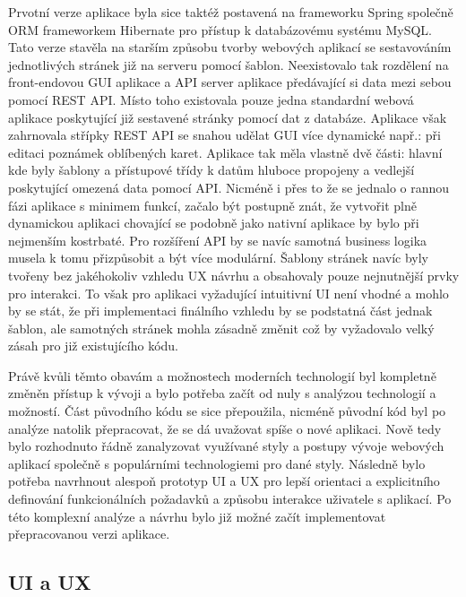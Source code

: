 	Prvotní verze aplikace byla sice taktéž postavená na frameworku Spring společně \ac{ORM} frameworkem Hibernate pro
	přístup k databázovému systému MySQL.
	Tato verze stavěla na starším způsobu tvorby webových aplikací se sestavováním jednotlivých stránek již na serveru pomocí
	šablon.
	Neexistovalo tak rozdělení na front-endovou \ac{GUI} aplikace a \ac{API} server aplikace předávající si data mezi sebou
	pomocí \ac{REST} \ac{API}.
	Místo toho existovala pouze jedna standardní webová aplikace poskytující již sestavené stránky pomocí dat z databáze.
	Aplikace však zahrnovala střípky \ac{REST} \ac{API} se snahou udělat \ac{GUI} více dynamické např.: při editaci poznámek
	oblíbených karet.
	Aplikace tak měla vlastně dvě části: hlavní kde byly šablony a přístupové třídy k datům hluboce propojeny a vedlejší
	poskytující omezená data pomocí \ac{API}.
	Nicméně i přes to že se jednalo o rannou fázi aplikace s minimem funkcí, začalo být postupně znát, že vytvořit
	plně dynamickou aplikaci chovající se podobně jako nativní aplikace by bylo při nejmenším kostrbaté.
	Pro rozšíření \ac{API} by se navíc samotná business logika musela k tomu přizpůsobit a být více modulární.
	Šablony stránek navíc byly tvořeny bez jakéhokoliv vzhledu \ac{UX} návrhu a obsahovaly pouze nejnutnější prvky pro
	interakci.
	To však pro aplikaci vyžadující intuitivní \ac{UI} není vhodné a mohlo by se stát, že při implementaci finálního vzhledu
	by se podstatná část jednak šablon, ale samotných stránek mohla zásadně změnit což by vyžadovalo velký zásah pro již
	existujícího kódu.

	Právě kvůli těmto obavám a možnostech moderních technologií byl kompletně změněn přístup k vývoji a bylo potřeba začít
	od nuly s analýzou technologií a možností.
	Část původního kódu se sice přepoužila, nicméně původní kód byl po analýze natolik přepracovat, že se dá uvažovat
	spíše o nové aplikaci.
	Nově tedy bylo rozhodnuto řádně zanalyzovat využívané styly a postupy vývoje webových aplikací společně s populárními
	technologiemi pro dané styly.
	Následně bylo potřeba navrhnout alespoň prototyp \ac{UI} a \ac{UX} pro lepší orientaci a explicitního definování
	funkcionálních požadavků a způsobu interakce uživatele s aplikací.
	Po této komplexní analýze a návrhu bylo již možné začít implementovat přepracovanou verzi aplikace.

	\subsection{UI a UX}

